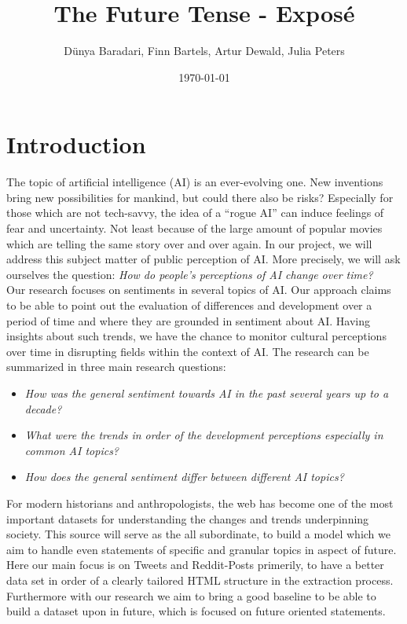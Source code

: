 \documentclass[11pt]{article}
\title{The Future Tense - Exposé}
\author{Dünya Baradari, Finn Bartels, Artur Dewald, Julia Peters}
\date{\today}
\begin{document}
\maketitle
\thispagestyle{empty}


\section{Introduction}
The topic of artificial intelligence (AI) is an ever-evolving one.
New inventions bring new possibilities for mankind, but could there also be risks?
Especially for those which are not tech-savvy, the idea of a “rogue AI” can induce feelings of fear and uncertainty.
Not least because of the large amount of popular movies which are telling the same story over and over again.
In our project, we will address this subject matter of public perception of AI.
More precisely, we will ask ourselves the question:
\textit{How do people’s perceptions of AI change over time?}
\\
Our research focuses on sentiments in several topics of AI.
Our approach claims to be able to point out the evaluation of differences and development over a period of time and where they are grounded in sentiment about AI.
Having insights about such trends, we have the chance to monitor cultural perceptions over time in disrupting fields within the context of AI.
The research can be summarized in three main research questions:

\begin{itemize}
\item \textit{How was the general sentiment towards AI in the past several years up to a decade?}
\item \textit{What were the trends in order of the development perceptions especially in common AI topics?}
\item \textit{How does the general sentiment differ between different AI topics?}
\end{itemize}
%
For modern historians and anthropologists, the web has become one of the most important datasets for understanding the changes and trends underpinning society.
This source will serve as the all subordinate, to build a model which we aim to handle even statements of specific and granular topics in aspect of future.
Here our main focus is on Tweets and Reddit-Posts primerily, to have a better data set in order of a clearly tailored HTML structure in the extraction process.
Furthermore with our research we aim to bring a good baseline to be able to build a dataset upon in future, which is focused on future oriented statements.
\end{document}
